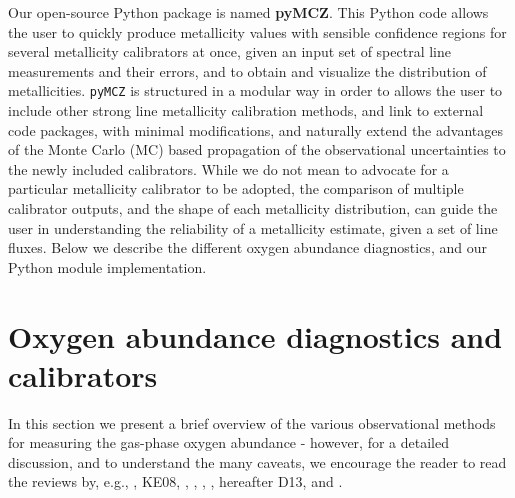 \documentclass{emulateapj}
\begin{document}
Our open-source Python package is named \textbf{pyMCZ}.  This Python
code allows the user to quickly produce metallicity values with
sensible confidence regions for several metallicity calibrators at
once, given an input set of spectral line measurements and their
errors, and to obtain and visualize the distribution of metallicities.
\verb=pyMCZ= is structured in a modular way in order to allows the
user to include other strong line metallicity calibration methods, and
link to external code packages, with minimal modifications, and
naturally extend the advantages of the Monte Carlo (MC) based
propagation of the observational uncertainties to the newly included
calibrators.  While we do not mean to advocate for a particular
metallicity calibrator to be adopted, the comparison of multiple
calibrator outputs, and the shape of each metallicity distribution,
can guide the user in understanding the reliability of a metallicity
estimate, given a set of line fluxes.  Below we describe the different
oxygen abundance diagnostics, and our Python module implementation.

\section{Oxygen abundance diagnostics and calibrators}\label{sec:diags}

In this section we present a brief overview of the various
observational methods for measuring the gas-phase oxygen abundance -
however, for a detailed discussion, and to understand the many
caveats, we encourage the reader to read the reviews by, e.g.,
\citet{stasinska02}, KE08, \citet{moustakas10}, \citet{stasinska10},
\citet{lopezsanchez12}, \citet{dopita13}, hereafter D13, and
\citet{blanc15}.
\end{document}
